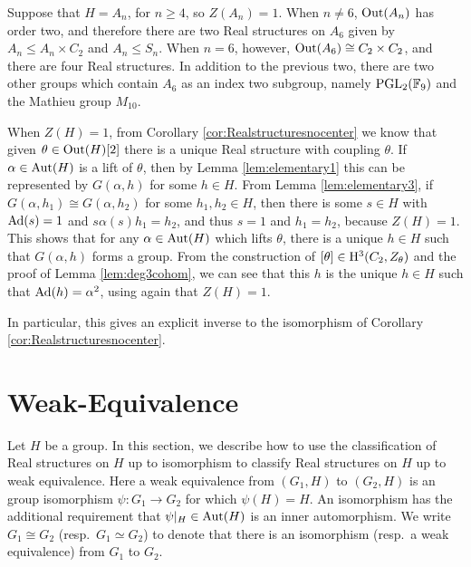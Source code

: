 \begin{eg}
Suppose that $H=A_n$, for $n \geq 4$, so $Z(A_n) = 1$. When $n \neq 6$, $\operatorname{Out}(A_n)$ has order two, and therefore there are two Real structures on $A_6$ given by $A_n \leq A_n \times C_2$ and $A_n \leq S_n$. When $n = 6$, however, $\operatorname{Out}(A_6) \cong C_2 \times C_2$, and there are four Real structures. In addition to the previous two, there are two other groups which contain $A_6$ as an index two subgroup, namely $\text{PGL}_2({\mathbb F}_9)$ and the Mathieu group $M_{10}$.
\end{eg}

\begin{remark}
  When $Z(H) = 1$, from Corollary \ref{cor:Realstructuresnocenter} we know that given $\theta \in \operatorname{Out}(H)[2]$ there is a unique Real structure with coupling $\theta$. If $\alpha \in \operatorname{Aut}(H)$ is a lift of $\theta$, then by Lemma \ref{lem:elementary1} this can be represented by $G(\alpha, h)$ for some $h \in H$. From Lemma \ref{lem:elementary3}, if $G(\alpha, h_1) \cong G(\alpha, h_2)$ for some $h_1, h_2 \in H$, then there is some $s \in H$ with $\operatorname{Ad}(s) = 1$ and $s\alpha(s)h_1 = h_2$, and thus $s = 1$ and $h_1 = h_2$, because $Z(H) = 1$. This shows that for any $\alpha \in \operatorname{Aut}(H)$ which lifts $\theta$, there is a unique $h \in H$ such that $G(\alpha,h)$ forms a group. From the construction of $[\theta] \in \mathrm{H}^3(C_2, Z_{\theta})$ and the proof of Lemma \ref{lem:deg3cohom}, we can see that this $h$ is the unique $h \in H$ such that $\operatorname{Ad}(h) = \alpha^2$, using again that $Z(H) = 1$.

  In particular, this gives an explicit inverse to the isomorphism of Corollary \ref{cor:Realstructuresnocenter}.
\end{remark}

\section{Weak-Equivalence}\label{sect:weakequiv}

Let $H$ be a group. In this section, we describe how to use the classification of Real structures on $H$ up to isomorphism to classify Real structures on $H$ up to weak equivalence. Here a weak equivalence from $(G_1, H)$ to $(G_2,H)$ is an group isomorphism $\psi \colon G_1 \rightarrow G_2$ for which $\psi(H) = H$. An isomorphism has the additional requirement that $\psi|_H \in \operatorname{Aut}(H)$ is an inner automorphism. We write $G_1 \cong G_2$ (resp.\ $G_1 \simeq G_2$) to denote that there is an isomorphism (resp.\ a weak equivalence) from $G_1$ to $G_2$.

